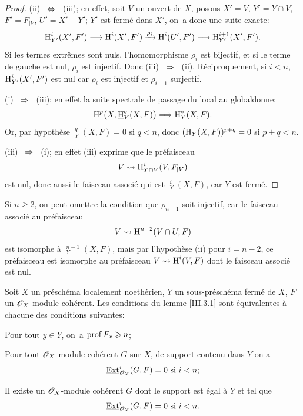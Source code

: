 \skpt

\begin{proof}
(ii) ~$\Ssi$~ (iii); en effet, soit $V$ un ouvert de $X$, posons $X'=V$, $Y'=Y\cap V$, $F'=F_{\mid V}$, $U'=X'- Y'$; $Y'$ est ferm\'e dans $X'$, on~a donc une suite exacte:
\[
\H_{Y'}^i(X', F') \to \H^i(X', F') \lto{\rho_i} \H^i(U', F') \to \H_{Y'}^{i+1}(X', F').
\]
Si les termes extr\^emes sont nuls, l'homomorphisme $\rho_i$ est bijectif, et si le terme de gauche est nul, $\rho_i$ est injectif. Donc (iii) ~$\To$~ (ii). R\'eciproquement, si $i<n$, $\operatorname{H}_{Y'}^i(X', F')$ est nul car $\rho_i$ est injectif et $\rho_{i-1}$ surjectif.

(i) ~$\To$~ (iii); en effet la suite spectrale \og de passage du local au global\fg donne:
\[
\H^p\bigl(X, \mathop{\underline{\mathrm{H}}}\nolimits_Y^q(X, F)\bigr) \To \H_Y^*(X, F).
\]
Or, par hypoth\`ese $\mathop{\underline{\mathrm{H}}}\nolimits_Y^q(X, F) =0$ si $q<n$, donc $(\operatorname{H}_Y (X, F))^{p+q} = 0$ si $p+q<n$.

(iii) ~$\To$~ (i); en effet (iii) exprime que le pr\'efaisceau
\[
V \rightsquigarrow \operatorname{H}_{Y\cap V}^i(V, F_{\mid V})
\]
est nul, donc aussi le faisceau associ\'e qui est $\mathop{\underline{\mathrm{H}}}\nolimits_Y^i (X, F)$, car $Y$ est ferm\'e.
\skipqed
\end{proof}

\begin{remarque} \label{III.3.2}
 Si $n\geq 2$, on peut omettre la condition que $\rho_{n-1}$ soit injectif, car le faisceau associ\'e au pr\'efaisceau
\[
V \rightsquigarrow \operatorname{H}^{n-2}(V\cap U, F)
\]
est isomorphe \`a $\mathop{\underline{\mathrm{H}}}\nolimits_Y^{n-1} (X, F)$, mais par l'hypoth\`ese (ii) pour $i=n-2$, ce pr\'efaisceau est isomorphe au pr\'efaisceau $V \rightsquigarrow \operatorname{H}^i(V, F)$ dont le faisceau associ\'e est nul.
\end{remarque}

\begin{proposition} \label{III.3.3}
Soit $X$ un pr\'esch\'ema localement noeth\'erien, $Y$ un sous-pr\'esch\'ema ferm\'e de $X$, $F$ un $\mathscr{O}_X$-module coh\'erent. Les conditions du lemme \ref{III.3.1} sont \'equivalentes \`a chacune des conditions suivantes:
\begin{enumeratei}
\setcounter{enumi}{3}
\item
Pour tout $y\in Y$, on~a $\operatorname{prof} F_x \geqslant n$;

\item
Pour tout $\mathscr{O}_X$-module coh\'erent $G$ sur $X$, de support contenu dans $Y$ on a
\[
\mathop{\underline{\mathrm{Ext}}}\nolimits_{\mathscr{O}_X}^i(G, F)=0 \text{ si } i<n;
\]

\item
Il existe un $\mathscr{O}_X$-module coh\'erent $G$ dont le support est \'egal \`a $Y$ et tel que
\[
\mathop{\underline{\mathrm{Ext}}}\nolimits_{\mathscr{O}_X}^i(G, F)=0 \text{ si } i<n.
\]
\end{enumeratei}
\end{proposition}

